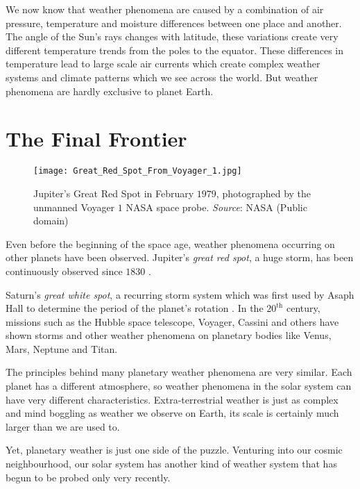 We now know that weather phenomena are caused by a combination of air pressure, temperature and 
moisture differences between one place and another. The angle of the Sun's rays changes with 
latitude, these variations create very different temperature trends from the poles to the equator. 
These differences in temperature lead to large scale air currents which create complex weather 
systems and climate patterns which we see across the world. But weather phenomena are hardly 
exclusive to planet Earth.

\section*{The Final Frontier}

\begin{wrapfigure}{r}{0.4\textwidth}
    \centering\texttt{[image: Great\_Red\_Spot\_From\_Voyager\_1.jpg]}
    \caption{
        {\small 
            Jupiter's Great Red Spot in February $1979$, photographed by the unmanned 
            Voyager $1$ NASA space probe. \textit{Source}: NASA (Public domain)
        }
    }
    \label{fig:jupiter}
\end{wrapfigure}

Even before the beginning of the space age, weather phenomena occurring on other planets have been 
observed. Jupiter's \emph{great red spot}, a huge storm, has been continuously observed since 
$1830$ \citetext{see \citealp{britannicaRedSpot}}.

Saturn's \emph{great white spot}, a recurring storm system which was first used by Asaph Hall to 
determine the period of the planet's rotation \citep{wikisaturn}. In the $20^{\text{th}}$ century, 
missions such as the Hubble space telescope, Voyager, Cassini and others have shown storms and 
other weather phenomena on planetary bodies like Venus, Mars, Neptune and Titan. 

The principles behind many planetary weather phenomena are very similar. Each planet has a 
different atmosphere, so weather phenomena in the solar system can have very different 
characteristics. Extra-terrestrial weather is just as complex and mind boggling as weather we 
observe on Earth, its scale is certainly much larger than we are used to. 

Yet, planetary weather is just one side of the puzzle. Venturing into our cosmic neighbourhood, 
our solar system has another kind of weather system that has begun to be probed only very recently. 

